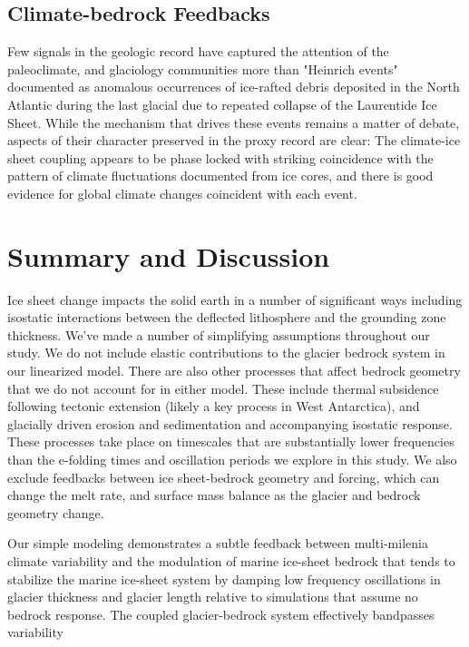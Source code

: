 \documentclass[tc, manuscript]{copernicus}
\begin{document}
\subsection{Climate-bedrock Feedbacks}


Few signals in the geologic record have captured the attention of the paleoclimate, and glaciology communities more than "Heinrich events" documented as anomalous occurrences of ice-rafted debris deposited in the North Atlantic during the last glacial due to repeated collapse of the Laurentide Ice Sheet.
While the mechanism that drives these events remains a matter of debate, aspects of their character preserved in the proxy record are clear:
The climate-ice sheet coupling appears to be phase locked with striking coincidence with the pattern of climate fluctuations documented from ice cores, and there is good evidence for global climate changes coincident with each event.


\section{Summary and Discussion}

Ice sheet change impacts the solid earth in a number of significant ways including isostatic interactions between the deflected lithosphere and the grounding zone thickness.
We've made a number of simplifying assumptions throughout our study. 
We do not include elastic contributions to the glacier bedrock system in our linearized model.
There are also other processes that affect bedrock geometry that we do not account for in either model.
These include thermal subsidence following tectonic extension (likely a key process in West Antarctica), and glacially driven erosion and sedimentation and accompanying isostatic response.
These processes take place on timescales that are substantially lower frequencies than the e-folding times and oscillation periods we explore in this study.
We also exclude feedbacks between ice sheet-bedrock geometry and forcing, which can change the melt rate, and surface mass balance as the glacier and bedrock geometry change.


\conclusions  
Our simple modeling demonstrates a subtle feedback between multi-milenia climate variability and the modulation of marine ice-sheet bedrock that tends to stabilize the marine ice-sheet system by damping low frequency oscillations in glacier thickness and glacier length relative to simulations that assume no bedrock response. 
The coupled glacier-bedrock system effectively bandpasses variability 
\end{document}
